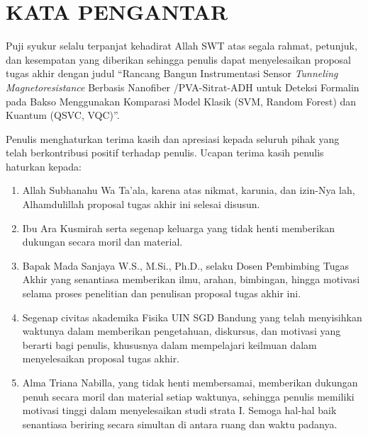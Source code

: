 \chapter*{\centering KATA PENGANTAR}

\setlength{\parskip}{0.3em} %

Puji syukur selalu terpanjat kehadirat Allah SWT atas segala rahmat, petunjuk, dan kesempatan yang diberikan sehingga penulis dapat menyelesaikan proposal tugas akhir dengan judul ``Rancang Bangun Instrumentasi Sensor \textit{Tunneling Magnetoresistance} Berbasis Nanofiber /PVA-Sitrat-ADH untuk Deteksi Formalin pada Bakso Menggunakan Komparasi Model Klasik (SVM, Random Forest) dan Kuantum (QSVC, VQC)''.

Penulis menghaturkan terima kasih dan apresiasi kepada seluruh pihak yang telah berkontribusi positif terhadap penulis. Ucapan terima kasih penulis haturkan kepada:

\begin{enumerate}[noitemsep, topsep=2pt, parsep=0pt, partopsep=0pt]
    \item Allah Subhanahu Wa Ta'ala, karena atas nikmat, karunia, dan izin-Nya lah, Alhamdulillah proposal tugas akhir ini selesai disusun.
    \item Ibu Ara Kusmirah serta segenap keluarga yang tidak henti memberikan dukungan secara moril dan material.
    \item Bapak Mada Sanjaya W.S., M.Si., Ph.D., selaku Dosen Pembimbing Tugas Akhir yang senantiasa memberikan ilmu, arahan, bimbingan, hingga motivasi selama proses penelitian dan penulisan proposal tugas akhir ini.
    \item Segenap civitas akademika Fisika UIN SGD Bandung yang telah menyisihkan waktunya dalam memberikan pengetahuan, diskursus, dan motivasi yang berarti bagi penulis, khususnya dalam mempelajari keilmuan dalam menyelesaikan proposal tugas akhir.
    \item Alma Triana Nabilla, yang tidak henti membersamai, memberikan dukungan penuh secara moril dan material setiap waktunya, sehingga penulis memiliki motivasi tinggi dalam menyelesaikan studi strata I. Semoga hal-hal baik senantiasa beriring secara simultan di antara ruang dan waktu padanya.
\end{enumerate}

